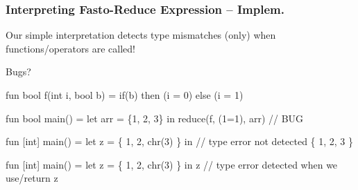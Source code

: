 \documentclass{beamer}
\newcommand{\emp}[1]{\textcolor{DikuRed}{ #1}}
\newcommand{\emphh}[1]{\textcolor{CosGreen}{ #1}}
\begin{document}
\begin{frame}[fragile, t]
\frametitle{Interpreting Fasto-Reduce Expression -- Implem.}

\smallskip

Our simple interpretation detects type mismatches (only) 
when functions/operators are called!
\bigskip

\begin{block}{Bugs?}
\begin{colorcode}[fontsize=\scriptsize]
fun bool f(int i, bool b) = if(b) then (i = 0) else (i = 1)

fun bool main() =
  let arr = \{1, 2, 3\} in
    reduce(f, (1=1), arr) // \alert{BUG}

fun [int] main() =
  let z = \{ 1, 2, chr(3) \} in //\emp{type error not detected}
     \{ 1, 2, 3 \}

fun [int] main() =
  let z = \{ 1, 2, chr(3) \} in
      z //\emphh{type error detected when we use/return z}
\end{colorcode} 
\end{block}

\end{frame}
\end{document}
